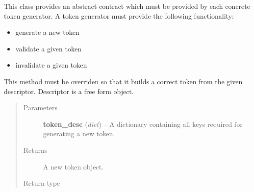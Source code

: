 \documentclass[letterpaper,10pt,english]{sphinxmanual}
\begin{document}

\begin{fulllineitems}
\label{features/oauth2/technical_summary:fantastico.oauth2.token_generator.TokenGenerator}
This class provides an abstract contract which must be provided by each concrete token generator. A token generator
must provide the following functionality:
\begin{itemize}
\item {} 
generate a new token

\item {} 
validate a given token

\item {} 
invalidate a given token

\end{itemize}

\begin{fulllineitems}
\label{features/oauth2/technical_summary:fantastico.oauth2.token_generator.TokenGenerator.generate}
This method must be overriden so that it builds a correct token from the given descriptor. Descriptor is a free
form object.
\begin{quote}\begin{description}
\item[{Parameters}] \leavevmode
\textbf{token\_desc} (\emph{dict}) -- A dictionary containing all keys required for generating a new token.

\item[{Returns}] \leavevmode
A new token object.

\item[{Return type}] \leavevmode
{\hyperref[features/oauth2/technical_summary:fantastico.oauth2.token.Token]{}}

\end{description}\end{quote}

\end{fulllineitems}



\end{fulllineitems}
\end{document}

